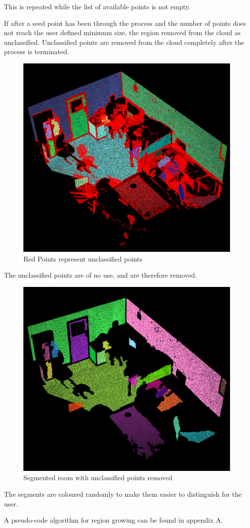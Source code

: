 		This is repeated while the list of available points is not empty.
		
		If after a seed point has been through the process and the number of points does not reach the user defined minimum size, the region removed from the cloud as unclassified. Unclassified points are removed from the cloud completely after the process is terminated.
		
		
		\begin{figure}[H]
			\centering
			\includegraphics[width=0.5\linewidth]{Includes/images/GrownRegions}
			\caption{Red Points represent unclassified points}
			\label{fig:GrownRegions}
		\end{figure}
		
		The unclassified points are of no use, and are therefore removed.
		
		
		\begin{figure}[H]
			\centering
			\includegraphics[width=0.5\linewidth]{Includes/images/RG-noUnclass}
			\caption{Segmented room with unclassified points removed}
			\label{fig:RG-noUnclass}
		\end{figure}
		
		The segments are coloured randomly to make them easier to distinguish for the user.
		
		A pseudo-code algorithm for region growing can be found in appendix A.
		
